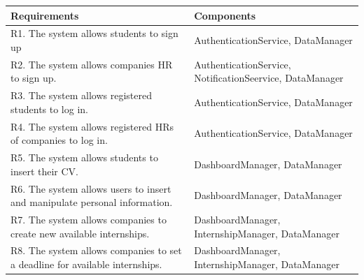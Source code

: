 \documentclass{article}
\begin{document}
\begin{table}[H]
    \centering
    \begin{tabular}{|p{}|p{}|}
        \hline
         \textbf{Requirements} & \textbf{Components} \\
        \hline
         R1. The system allows students to sign up\newline
         &
        AuthenticationService, \newline
        DataManager\\
        \hline
        R2. The system allows companies HR to sign up.\newline
         &
        AuthenticationService,\newline
        NotificationSeervice,\newline
        DataManager\\
        \hline
        R3. The system allows registered students to log in.\newline
         &
        AuthenticationService,\newline
        DataManager\\
        \hline

        R4. The system allows registered HRs of companies to log in.\newline
         &
        AuthenticationService,\newline
        DataManager\\
        \hline

        R5. The system allows students to insert their CV.\newline
         &
        DashboardManager,\newline
        DataManager\\
        \hline

        R6. The system allows users to insert and manipulate personal information.\newline
         &
        DashboardManager,\newline
        DataManager\\
        \hline

        R7. The system allows companies to create new available internships.\newline
         &
        DashboardManager,\newline
        InternshipManager,\newline
        DataManager\\
        \hline

        R8. The system allows companies to set a deadline for available internships.\newline
         &
        DashboardManager,\newline
        InternshipManager,\newline
        DataManager\\
        \hline


\end{tabular}
\end{table}
\end{document}
